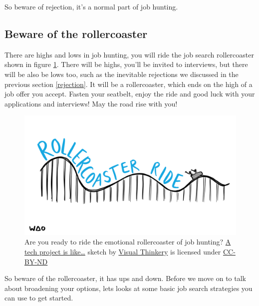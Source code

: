 \documentclass[
]{book}
\begin{document}
So beware of rejection, it's a normal part of job hunting. 🤮

\hypertarget{rollercoaster}{%
\subsection{Beware of the rollercoaster}\label{rollercoaster}}

There are highs and lows in job hunting, you will ride the job search rollercoaster shown in figure \ref{fig:rollercoaster-fig}. There will be highs, you'll be invited to interviews, but there will be also be lows too, such as the inevitable rejections we discussed in the previous section \ref{rejection}. It will be a rollercoaster, which ends on the high of a job offer you accept. Fasten your seatbelt, enjoy the ride and good luck with your applications and interviews! May the road rise with you! \citep{rise}

\begin{figure}

{\centering \includegraphics[width=0.98\linewidth]{images/Rollercoaster-ride} 

}

\caption{Are you ready to ride the emotional rollercoaster of job hunting? \href{https://bryanmmathers.com/rollercoaster-ride}{A tech project is like\ldots{}} sketch by \href{https://visualthinkery.com/}{Visual Thinkery} is licensed under \href{https://creativecommons.org/licenses/by-nd/4.0/}{CC-BY-ND}}\label{fig:rollercoaster-fig}
\end{figure}



So beware of the rollercoaster, it has ups and down. Before we move on to talk about broadening your options, lets looks at some basic job search strategies you can use to get started. 🎢
\end{document}
